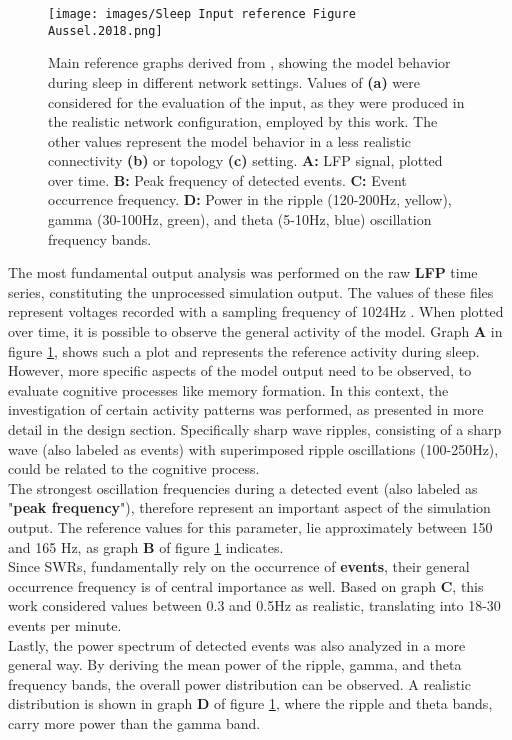     \begin{figure}
        \centering
        \texttt{[image: images/Sleep Input reference Figure Aussel.2018.png]}
        \caption{Main reference graphs derived from \textcite{Aussel.2018}, showing the model behavior during sleep in different network settings. Values of \textbf{(a)} were considered for the evaluation of the input, as they were produced in the realistic network configuration, employed by this work. The other values represent the model behavior in a less realistic connectivity \textbf{(b)} or topology \textbf{(c)} setting. \textbf{A:} LFP signal, plotted over time. \textbf{B:} Peak frequency of detected events. \textbf{C:} Event occurrence frequency. \textbf{D:} Power in the ripple (120-200Hz, yellow), gamma (30-100Hz, green), and theta (5-10Hz, blue) oscillation frequency bands.}
        \label{fig:input_reference}
    \end{figure}
    
    The most fundamental output analysis was performed on the raw \textbf{LFP} time series, constituting the unprocessed simulation output. The values of these files represent voltages recorded with a sampling frequency of 1024Hz \cite{HippSimModel.1}. When plotted over time, it is possible to observe the general activity of the model. Graph \textbf{A} in figure \ref{fig:input_reference}, shows such a plot and represents the reference activity during sleep.\\
    However, more specific aspects of the model output need to be observed, to evaluate cognitive processes like memory formation. In this context, the investigation of certain activity patterns was performed, as presented in more detail in the design section. Specifically sharp wave ripples, consisting of a sharp wave (also labeled as events) with superimposed ripple oscillations (100-250Hz), could be related to the cognitive process.\\
    The strongest oscillation frequencies during a detected event (also labeled as "\textbf{peak frequency}"), therefore represent an important aspect of the simulation output. The reference values for this parameter, lie approximately between 150 and 165 Hz, as graph \textbf{B} of figure \ref{fig:input_reference} indicates.\\
    Since SWRs, fundamentally rely on the occurrence of \textbf{events}, their general occurrence frequency is of central importance as well. Based on graph \textbf{C}, this work considered values between 0.3 and 0.5Hz as realistic, translating into 18-30 events per minute.\\
    Lastly, the power spectrum of detected events was also analyzed in a more general way. By deriving the mean power of the ripple, gamma, and theta frequency bands, the overall power distribution can be observed. A realistic distribution is shown in graph \textbf{D} of figure \ref{fig:input_reference}, where the ripple and theta bands, carry more power than the gamma band.

